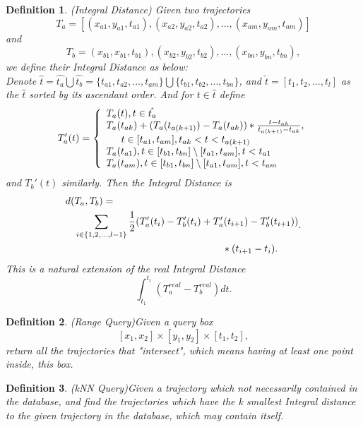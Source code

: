 \documentclass[sigplan]{acmart}
\newtheorem{myDef}{Definition}
\begin{document}
\begin{myDef}
  (Integral Distance) Given two trajectories $$T_a=[(x_{a1},y_{a1},t_{a1}), (x_{a2},y_{a2},t_{a2}), ..., (x_{am},y_{am},t_{am})]$$ and $$T_b=(x_{b1},x_{b1},t_{b1}), (x_{b2}, y_{b2}, t_{b2}), ..., (x_{bn}, y_{bn}, t_{bn}),$$ we define their Integral Distance as below:\\
  Denote $\hat{t}=\hat{t_a}\bigcup\hat{t_b}=\{t_{a1}, t_{a2}, ..., t_{am}\}\bigcup \{t_{b1}, t_{b2}, ..., t_{bn}\}$, and $\check{t}=[t_1, t_2, ..., t_l]$ as the $\hat{t}$ sorted by its ascendant order. And for $t \in \hat{t}$ define
  $$T_a'(t)=\left\{
             \begin{array}{lr}
             T_a(t), t \in \hat{t_a} \\
             T_a(t_{ak})+ (T_a(t_{a(k+1)})-T_a(t_{ak}))* \frac{t-t_{ak}}{t_{a(k+1)}-t_{ak}}, \\
             \indent  t \in [t_{a1}, t_{am}], t_{ak}<t<t_{a(k+1)} \\
             T_a(t_{a1}), t \in [t_{b1},t_{bn}] \setminus [t_{a1},t_{am}], t< t_{a1} \\
             T_a(t_{am}), t \in [t_{b1},t_{bn}] \setminus [t_{a1},t_{am}], t< t_{am}
             \end{array}
    \right.$$
  and $T_b'(t)$ similarly. Then the Integral Distance is
  $$
  \begin{aligned}
  d(&T_a,T_b)=\\
  &\sum_{i \in \{1, 2, ..., l-1\}} \frac{1}{2} (T_a'(t_i)-T_b'(t_i)+T_a'(t_{i+1})-T_b'(t_{i+1}))\\
  &\indent\indent\indent\indent\indent\indent\indent\indent\indent\indent*(t_{i+1}-t_i).
  \end{aligned}.
  $$
  This is a natural extension of the real Integral Distance
  $$\int_{t_1}^{t_l}(T_{a}^{real}-T_{b}^{real})dt.$$
\end{myDef}
\begin{myDef}
  (Range Query)Given a query box $$[x_1,x_2] \times [y_1,y_2] \times [t_1,t_2],$$return all the trajectories that "intersect", which means having at least one point inside, this box.
\end{myDef}
\begin{myDef}
  (kNN Query)Given a trajectory which not necessarily contained in the database, and find the trajectories which have the k smallest Integral distance to the given trajectory in the database, which may contain itself.
\end{myDef}
\end{document}
